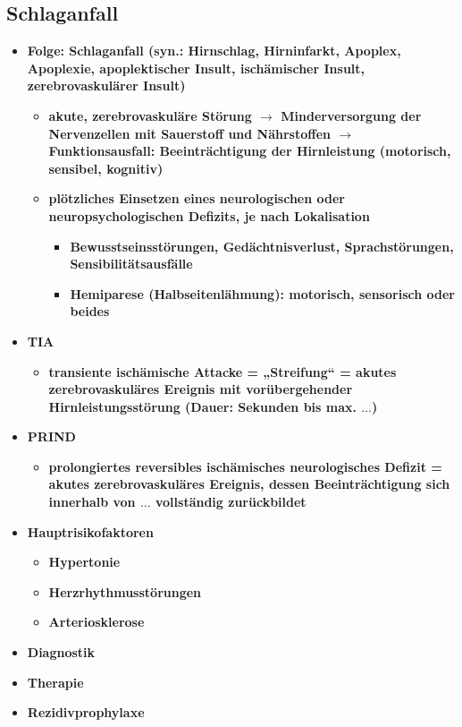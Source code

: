 	\subsection{Schlaganfall}
		\begin{itemize}
			\item \textbf{Folge: Schlaganfall (syn.: Hirnschlag, Hirninfarkt, Apoplex, Apoplexie, apoplektischer Insult, ischämischer Insult, zerebrovaskulärer Insult)}
				\begin{itemize}
					\item \textbf{akute, zerebrovaskuläre Störung $\rightarrow$ Minderversorgung der Nervenzellen mit Sauerstoff und Nährstoffen $\rightarrow$ Funktionsausfall: Beeinträchtigung der Hirnleistung (motorisch, sensibel, kognitiv)}
					\item \textbf{plötzliches Einsetzen eines neurologischen oder neuropsychologischen Defizits, je nach Lokalisation}
						\begin{itemize}
							\item \textbf{Bewusstseinsstörungen, Gedächtnisverlust, Sprachstörungen, Sensibilitätsausfälle}
							\item \textbf{Hemiparese (Halbseitenlähmung): motorisch, sensorisch oder beides}
						\end{itemize}
				\end{itemize}
			\item \textbf{TIA}
				\begin{itemize}
					\item \textbf{transiente ischämische Attacke = „Streifung“ = akutes zerebrovaskuläres Ereignis mit vorübergehender Hirnleistungsstörung (Dauer: Sekunden bis max. $\dots$)}
				\end{itemize}
			\item \textbf{PRIND}
				\begin{itemize}
					\item \textbf{prolongiertes reversibles ischämisches neurologisches Defizit = akutes zerebrovaskuläres Ereignis, dessen Beeinträchtigung sich innerhalb von $\dots$ vollständig zurückbildet}
				\end{itemize}
			\item \textbf{Hauptrisikofaktoren}
				\begin{itemize}
					\item \textbf{Hypertonie}
					\item \textbf{Herzrhythmusstörungen}
					\item \textbf{Arteriosklerose}
				\end{itemize}
			\item \textbf{Diagnostik}
			\item \textbf{Therapie}
			\item \textbf{Rezidivprophylaxe}
		\end{itemize}

